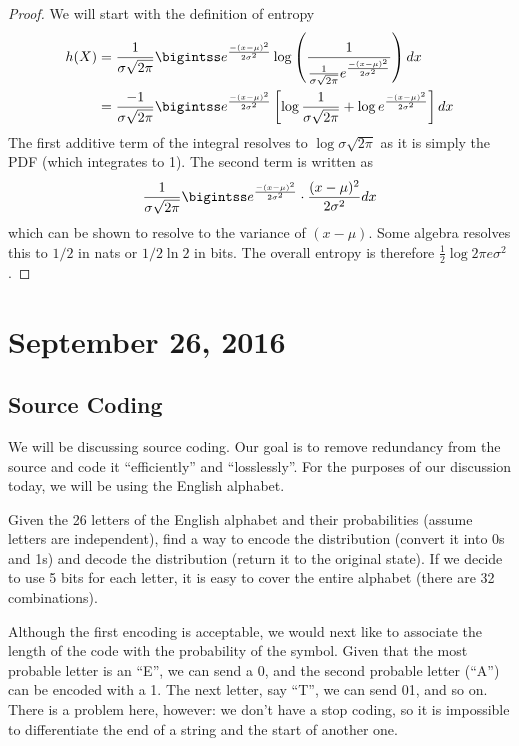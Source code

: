 \documentclass[11pt]{article}
\theoremstyle{definition}
\begin{document}
\begin{proof}
We will start with the definition of entropy 
\begin{align*}
h(X) &= \frac{1}{\sigma \sqrt{2\pi}} \bigintss e^{\frac{-(x - \mu)^2}{2 \sigma^2}} \log \left( \frac{1}{\frac{1}{\sigma \sqrt{2 \pi}} e^{\frac{-(x - \mu)^2}{2 \sigma^2}}} \right) dx \\
 &=   \frac{-1}{\sigma \sqrt{2\pi}} \bigintss e^{\frac{-(x - \mu)^2}{2 \sigma^2}} \left[ \log \frac{1}{\sigma \sqrt{2\pi}} + \log e^{\frac{-(x - \mu)^2}{2 \sigma^2}} \right] dx
\end{align*}
The first additive term of the integral resolves to $\log \sigma \sqrt{2\pi}$ as it is simply the PDF (which integrates to 1). The second term is written as
\begin{align*}
\frac{1}{\sigma \sqrt{2\pi}} \bigintss e^{\frac{-(x - \mu)^2}{2 \sigma^2}} \cdot \frac{(x-\mu)^2}{2\sigma^2} dx
\end{align*}
which can be shown to resolve to the variance of $(x-\mu)$. Some algebra resolves this to $1/2$ in nats or $1/2\ln 2$ in bits. The overall entropy is therefore $\frac{1}{2} \log 2 \pi e \sigma^2$. 
\end{proof}
\section{September 26, 2016}

\subsection{Source Coding} 

We will be discussing source coding. Our goal is to remove redundancy from the source and code it ``efficiently'' and ``losslessly''. For the purposes of our discussion today, we will be using the English alphabet. 

\example Given the 26 letters of the English alphabet and their probabilities (assume letters are independent), find a way to encode the distribution (convert it into 0s and 1s) and decode the distribution (return it to the original state). If we decide to use 5 bits for each letter, it is easy to cover the entire alphabet (there are 32 combinations). 

\example Although the first encoding is acceptable, we would next like to associate the length of the code with the probability of the symbol. Given that the most probable letter is an ``E'', we can send a 0, and the second probable letter (``A'') can be encoded with a 1. The next letter, say ``T'', we can send 01, and so on. There is a problem here, however: we don't have a stop coding, so it is impossible to differentiate the end of a string and the start of another one. \\
\end{document}
